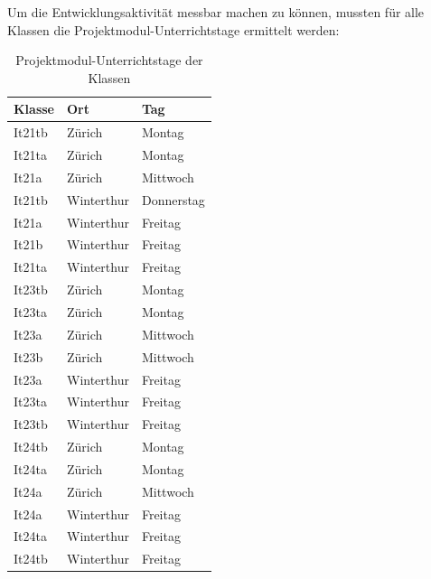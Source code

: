 Um die Entwicklungsaktivität messbar machen zu können, mussten für alle Klassen die Projektmodul-Unterrichtstage ermittelt werden:
\begin{table}[ht]
\caption{Projektmodul-Unterrichtstage der Klassen}
\label{tab:stundenplan}
\centering
\begin{tabular}{l l l}
\toprule
\textbf{Klasse} & \textbf{Ort} & \textbf{Tag} \\
\midrule
It21tb   & Zürich      & Montag      \\
It21ta   & Zürich      & Montag      \\
It21a    & Zürich      & Mittwoch    \\
It21tb   & Winterthur  & Donnerstag  \\
It21a    & Winterthur  & Freitag     \\
It21b    & Winterthur  & Freitag     \\
It21ta   & Winterthur  & Freitag     \\
\midrule
It23tb   & Zürich      & Montag      \\
It23ta   & Zürich      & Montag      \\
It23a    & Zürich      & Mittwoch    \\
It23b    & Zürich      & Mittwoch    \\
It23a    & Winterthur  & Freitag     \\
It23ta   & Winterthur  & Freitag     \\
It23tb   & Winterthur  & Freitag     \\
\midrule
It24tb   & Zürich      & Montag      \\
It24ta   & Zürich      & Montag      \\
It24a    & Zürich      & Mittwoch    \\
It24a    & Winterthur  & Freitag     \\
It24ta   & Winterthur  & Freitag     \\
It24tb   & Winterthur  & Freitag     \\
\bottomrule
\end{tabular}
\end{table}